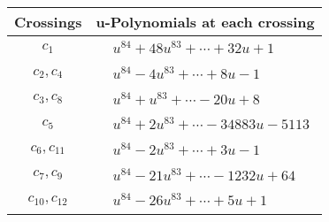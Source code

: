 \documentclass[1p]{elsarticle_modified}
\theoremstyle{definition}
\begin{document}
\begin{tabular}{m{50pt}|m{274pt}}
Crossings & \hspace{64pt}u-Polynomials at each crossing \\
\hline $$\begin{aligned}c_{1}\end{aligned}$$&$\begin{aligned}
&u^{84}+48 u^{83}+\cdots+32 u+1
\end{aligned}$\\
\hline $$\begin{aligned}c_{2},c_{4}\end{aligned}$$&$\begin{aligned}
&u^{84}-4 u^{83}+\cdots+8 u-1
\end{aligned}$\\
\hline $$\begin{aligned}c_{3},c_{8}\end{aligned}$$&$\begin{aligned}
&u^{84}+u^{83}+\cdots-20 u+8
\end{aligned}$\\
\hline $$\begin{aligned}c_{5}\end{aligned}$$&$\begin{aligned}
&u^{84}+2 u^{83}+\cdots-34883 u-5113
\end{aligned}$\\
\hline $$\begin{aligned}c_{6},c_{11}\end{aligned}$$&$\begin{aligned}
&u^{84}-2 u^{83}+\cdots+3 u-1
\end{aligned}$\\
\hline $$\begin{aligned}c_{7},c_{9}\end{aligned}$$&$\begin{aligned}
&u^{84}-21 u^{83}+\cdots-1232 u+64
\end{aligned}$\\
\hline $$\begin{aligned}c_{10},c_{12}\end{aligned}$$&$\begin{aligned}
&u^{84}-26 u^{83}+\cdots+5 u+1
\end{aligned}$\\
\hline
\end{tabular}\\~\\
\newpage\renewcommand{\arraystretch}{1}
\end{document}

